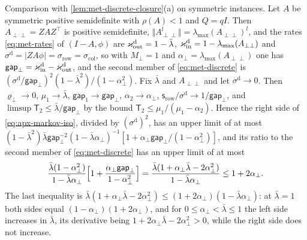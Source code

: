 Comparison with \cref{lem:met-discrete-closure}(a) on symmetric instances. Let $A$ be symmetric positive semidefinite with $\rho(A)<1$ and $Q=qI$. Then $A_{\perp\perp}=ZAZ^\top$ is positive semidefinite, $\Vert A_{\perp\perp}^l\Vert=\lambda_{\max}(A_{\perp\perp})^l$, and the rates \eqref{eq:met-rates} of $(I-A,\phi)$ are $\varkappa_{\mathrm{out}}^{\mathrm d}=1-\bar\lambda$, $\varkappa_{\mathrm{in}}^{\mathrm d}=1-\lambda_{\max}(A_{\perp\perp})$ and $\sigma^{\mathrm d}=\lvert ZA\phi\rvert=\sigma_{\mathrm{row}}=\sigma_{\mathrm{col}}$, so with $M_\perp=1$ and $\alpha_\perp=\lambda_{\max}(A_{\perp\perp})$ one has $\mathsf{gap}_\perp=\varkappa_{\mathrm{in}}^{\mathrm d}-\varkappa_{\mathrm{out}}^{\mathrm d}$, and the second member of \eqref{eq:met-discrete} is $(\sigma^{\mathrm d}/\mathsf{gap}_\perp)^2(1-\bar\lambda^2)/(1-\alpha_\perp^2)$. Fix $\bar\lambda$ and $A_{\perp\perp}$ and let $\sigma^{\mathrm d}\to0$. Then $\varrho_\perp\to0$, $\mu_1\to\bar\lambda$, $\mathsf{gap}_1\to\mathsf{gap}_\perp$, $\alpha_2\to\alpha_\perp$, $\mathsf s_{\mathrm{row}}/\sigma^{\mathrm d}\to1/\mathsf{gap}_\perp$, and $\limsup\mathsf T_2\le\bar\lambda/\mathsf{gap}_\perp$ by the bound $\mathsf T_2\le\mu_1/(\mu_1-\alpha_2)$. Hence the right side of \eqref{eq:apx-markov-iso}, divided by $(\sigma^{\mathrm d})^2$, has an upper limit of at most $(1-\bar\lambda^2)\bar\lambda\mathsf{gap}_\perp^{-2}(1-\bar\lambda\alpha_\perp)^{-1}[1+\alpha_\perp\mathsf{gap}_\perp/(1-\alpha_\perp^2)]$, and its ratio to the second member of \eqref{eq:met-discrete} has an upper limit of at most
\begin{equation*}
\frac{\bar\lambda(1-\alpha_\perp^2)}{1-\bar\lambda\alpha_\perp}\Bigl[1+\frac{\alpha_\perp\mathsf{gap}_\perp}{1-\alpha_\perp^2}\Bigr]=\frac{\bar\lambda(1+\alpha_\perp\bar\lambda-2\alpha_\perp^2)}{1-\bar\lambda\alpha_\perp}\le1+2\alpha_\perp .
\end{equation*}
The last inequality is $\bar\lambda(1+\alpha_\perp\bar\lambda-2\alpha_\perp^2)\le(1+2\alpha_\perp)(1-\bar\lambda\alpha_\perp)$: at $\bar\lambda=1$ both sides equal $(1-\alpha_\perp)(1+2\alpha_\perp)$, and for $0\le\alpha_\perp<\bar\lambda\le1$ the left side increases in $\bar\lambda$, its derivative being $1+2\alpha_\perp\bar\lambda-2\alpha_\perp^2>0$, while the right side does not increase.

